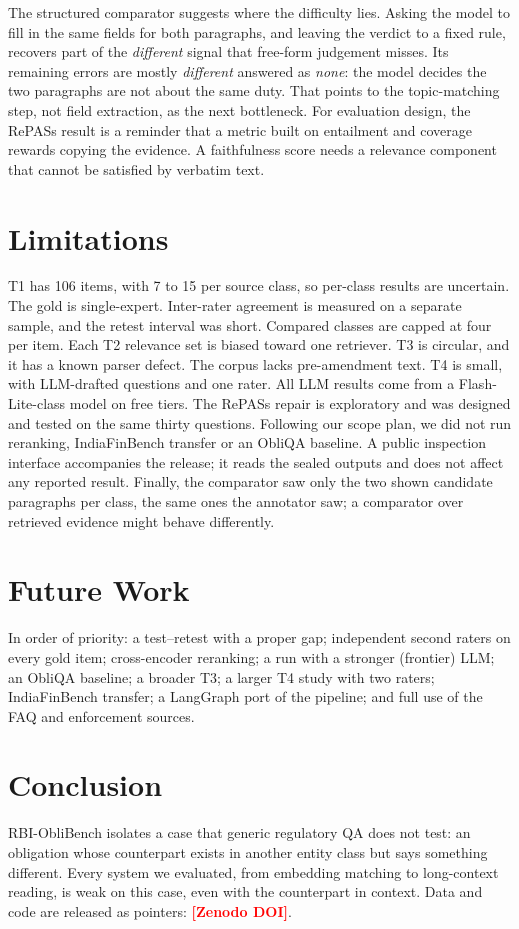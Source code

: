 \documentclass[conference]{IEEEtran}
\newcommand{\placeholder}[1]{\textcolor{red}{\textbf{[#1]}}}
\begin{document}
The structured comparator suggests where the difficulty lies. Asking the model to fill in the same fields for both paragraphs, and
leaving the verdict to a fixed rule, recovers part of the \textit{different} signal that free-form judgement misses. Its remaining
errors are mostly \textit{different} answered as \textit{none}: the model decides the two paragraphs are not about the same duty.
That points to the topic-matching step, not field extraction, as the next bottleneck. For evaluation design, the RePASs result is a
reminder that a metric built on entailment and coverage rewards copying the evidence. A faithfulness score needs a relevance
component that cannot be satisfied by verbatim text.

\section{Limitations}\label{sec:limitations}
T1 has 106 items, with 7 to 15 per source class, so per-class results are uncertain. The
gold is single-expert. Inter-rater agreement is measured on a separate sample, and the retest interval was short. Compared classes
are capped at four per item. Each T2 relevance set is biased toward one retriever. T3 is circular, and it has a known parser defect.
The corpus lacks pre-amendment text. T4 is small, with LLM-drafted questions and one rater. All LLM results come from a
Flash-Lite-class model on free tiers. The RePASs repair is exploratory and was designed and tested on the same thirty questions. Following our scope plan, we did not run
reranking, IndiaFinBench transfer or an ObliQA baseline. A public inspection interface accompanies the release; it reads the sealed outputs and does not affect any reported result. Finally, the comparator saw only the two shown
candidate paragraphs per class, the same ones the annotator saw; a comparator over retrieved evidence might behave differently.

\section{Future Work}\label{sec:future}
In order of priority: a test--retest with a proper gap; independent second raters on every gold item; cross-encoder reranking;
a run with a stronger (frontier) LLM; an ObliQA baseline; a broader T3; a larger T4 study with two raters; IndiaFinBench transfer;
a LangGraph port of the pipeline; and full use of the FAQ and enforcement sources.

\section{Conclusion}\label{sec:conclusion}
RBI-ObliBench isolates a case that generic regulatory QA does not test: an obligation whose counterpart exists in another entity
class but says something different. Every system we evaluated, from embedding matching to long-context reading, is weak on this
case, even with the counterpart in context. Data and code are released as pointers: \placeholder{Zenodo DOI}.
\end{document}
